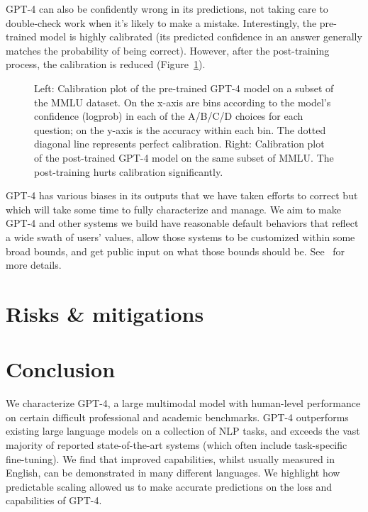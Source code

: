 \documentclass{article}
\begin{document}
GPT-4 can also be confidently wrong in its predictions, not taking care to double-check work when it’s likely to make a mistake. Interestingly, the pre-trained model is highly calibrated (its predicted confidence in an answer generally matches the probability of being correct). However, after the post-training process, the calibration is reduced (Figure~\ref{fig:calibration}).

\begin{figure}[htbp]
    \centering
    \caption{Left: Calibration plot of the pre-trained GPT-4 model on a subset of the MMLU dataset. On the x-axis are bins according to the model’s confidence (logprob) in each of the A/B/C/D choices for each question; on the y-axis is the accuracy within each bin. The dotted diagonal line represents perfect calibration. Right: Calibration plot of the post-trained GPT-4 model on the same subset of MMLU. The post-training hurts calibration significantly.}
    \label{fig:calibration}
\end{figure}

GPT-4 has various biases in its outputs that we have taken efforts to correct but which will take some time to fully characterize and manage. 
We aim to make GPT-4 and other systems we build have reasonable default behaviors that reflect a wide swath of users’ values, allow those systems to be customized within some broad bounds, and get public input on what those bounds should be. See~\citet{openaibehaveblog} for more details.








\section{Risks \& mitigations}


\section{Conclusion}

We characterize GPT-4, a large multimodal model with human-level performance on certain difficult professional and academic benchmarks. GPT-4 outperforms existing large language models on a collection of NLP tasks, and exceeds the vast majority of reported state-of-the-art systems (which often include task-specific fine-tuning). We find that improved capabilities, whilst usually measured in English, can be demonstrated in many different languages. We highlight how predictable scaling allowed us to make accurate predictions on the loss and capabilities of GPT-4. 
\end{document}
